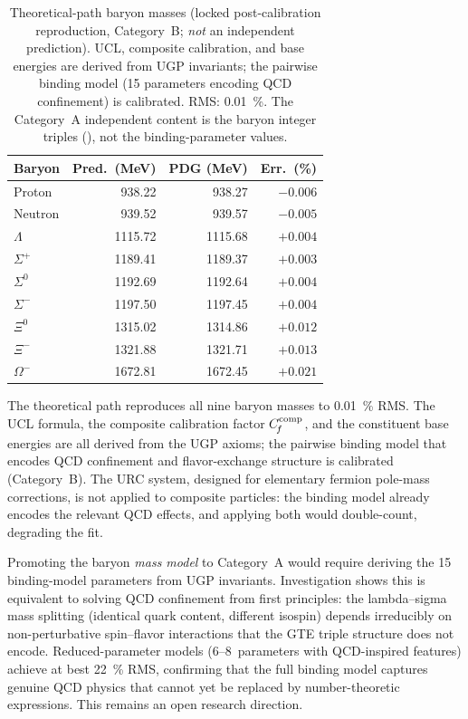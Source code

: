 \documentclass[11pt]{article}
\theoremstyle{remark}
\newcommand{\Cf}{C_{\!f}}
\begin{document}
\begin{table}[H]
\centering
\caption{Theoretical-path baryon masses (locked post-calibration reproduction, Category~B; \emph{not} an independent prediction). UCL, composite calibration, and base energies are derived from UGP invariants; the pairwise binding model (15 parameters encoding QCD confinement) is calibrated.  RMS: \SI{0.01}{\percent}.  The Category~A independent content is the baryon integer triples (), not the binding-parameter values.}
\label{tab:baryons_theoretical}
\renewcommand{\arraystretch}{1.05}
\footnotesize
\begin{tabular}{@{}l r r r@{}}
\toprule
\textbf{Baryon} & \textbf{Pred.\ (MeV)} & \textbf{PDG (MeV)} & \textbf{Err.\ (\%)} \\
\midrule
Proton     & 938.22 & 938.27  & $-0.006$ \\
Neutron    & 939.52 & 939.57  & $-0.005$ \\
$\Lambda$  & 1115.72  & 1115.68 & $+0.004$ \\
$\Sigma^+$ & 1189.41  & 1189.37 & $+0.003$ \\
$\Sigma^0$ & 1192.69  & 1192.64 & $+0.004$ \\
$\Sigma^-$ & 1197.50  & 1197.45 & $+0.004$ \\
$\Xi^0$    & 1315.02  & 1314.86 & $+0.012$ \\
$\Xi^-$    & 1321.88  & 1321.71 & $+0.013$ \\
$\Omega^-$ & 1672.81  & 1672.45 & $+0.021$ \\
\bottomrule
\end{tabular}
\end{table}

The theoretical path reproduces all nine baryon masses to \SI{0.01}{\percent} RMS.
The UCL formula, the composite calibration factor $\Cf^{\rm comp}$, and the constituent base energies are all derived from the UGP axioms; the pairwise binding model that encodes QCD confinement and flavor-exchange structure is calibrated (Category~B).
The URC system, designed for elementary fermion pole-mass corrections, is not applied to composite particles: the binding model already encodes the relevant QCD effects, and applying both would double-count, degrading the fit.

Promoting the baryon \emph{mass model} to Category~A would require deriving the 15 binding-model parameters from UGP invariants.
Investigation shows this is equivalent to solving QCD confinement from first principles: the lambda--sigma mass splitting (identical quark content, different isospin) depends irreducibly on non-perturbative spin--flavor interactions that the GTE triple structure does not encode.
Reduced-parameter models (6--8~parameters with QCD-inspired features) achieve at best \SI{22}{\percent} RMS, confirming that the full binding model captures genuine QCD physics that cannot yet be replaced by number-theoretic expressions.
This remains an open research direction.
\end{document}
